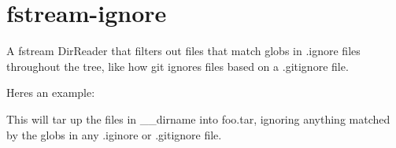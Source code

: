 \chapter{fstream-\/ignore}
\hypertarget{md__c_1_2_users_2_s_t_r_i_d_e_r_2source_2repos_2_internal_a_p_i_2_internal_a_p_i_2wwwroot_2lib_2aafe909be08d4b1c0cb06e928b52b4da}{}\label{md__c_1_2_users_2_s_t_r_i_d_e_r_2source_2repos_2_internal_a_p_i_2_internal_a_p_i_2wwwroot_2lib_2aafe909be08d4b1c0cb06e928b52b4da}
\label{md__c_1_2_users_2_s_t_r_i_d_e_r_2source_2repos_2_internal_a_p_i_2_internal_a_p_i_2wwwroot_2lib_2aafe909be08d4b1c0cb06e928b52b4da_autotoc_md2372}%
%
 A fstream Dir\+Reader that filters out files that match globs in {\ttfamily .ignore} files throughout the tree, like how git ignores files based on a {\ttfamily .gitignore} file.

Here\textquotesingle{}s an example\+:


\begin{DoxyCode}{0}
\DoxyCodeLine{\ \ \ \ \ \ \ \})}
\DoxyCodeLine{\ \ \})}

\end{DoxyCode}


This will tar up the files in \+\_\+\+\_\+dirname into {\ttfamily foo.\+tar}, ignoring anything matched by the globs in any .iginore or .gitignore file. 